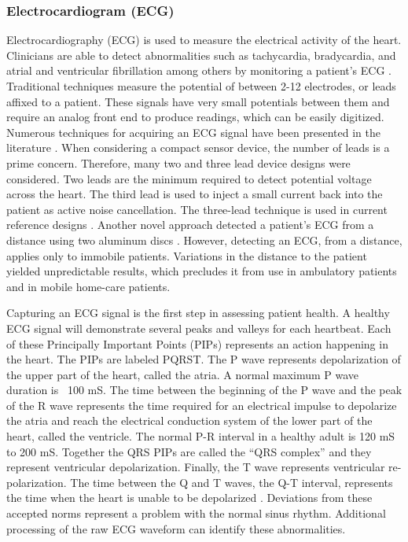 \subsubsection{Electrocardiogram (ECG)}
\label{subsubsec:Electrocardiogram}
Electrocardiography (ECG) is used to measure the electrical activity of the heart. Clinicians are able to detect abnormalities such as tachycardia, bradycardia, and atrial and ventricular fibrillation among others by monitoring a patient's ECG . Traditional techniques measure the potential of between 2-12 electrodes, or leads affixed to a patient. These signals have very small potentials between them and require an analog front end to produce readings, which can be easily digitized. Numerous techniques for acquiring an ECG signal have been presented in the literature \cite{Kim2011,Yan2011,Faggion2011,Secerbegovic2011}.  When considering a compact sensor device, the number of leads is a prime concern. Therefore, many two and three lead device designs were considered. Two leads are the minimum required to detect potential voltage across the heart. The third lead is used to inject a small current back into the patient as active noise cancellation. The three-lead technique is used in current reference designs \cite{TI2006} . Another novel approach detected a patient's ECG from a distance using two aluminum discs \cite{Belgacem2011}. However, detecting an ECG, from a distance, applies only to immobile patients. Variations in the distance to the patient yielded unpredictable results, which precludes it from use in ambulatory patients and in mobile home-care patients. 

Capturing an ECG signal is the first step in assessing patient health. A healthy ECG signal will demonstrate several peaks and valleys for each heartbeat. Each of these Principally Important Points (PIPs) represents an action happening in the heart. The PIPs are labeled PQRST. The P wave represents depolarization of the upper part of the heart, called the atria. A normal maximum P wave duration is ~100 mS. The time between the beginning of the P wave and the peak of the R wave represents the time required for an electrical impulse to depolarize the atria and reach the electrical conduction system of the lower part of the heart, called the ventricle. The normal P-R interval in a healthy adult is 120 mS to 200 mS. Together the QRS PIPs are called the ``QRS complex'' and they represent ventricular depolarization. Finally, the T wave represents ventricular re-polarization. The time between the Q and T waves, the Q-T interval, represents the time when the heart is unable to be depolarized \cite{Khorovets2000}. Deviations from these accepted norms represent a problem with the normal sinus rhythm. Additional processing of the raw ECG waveform can identify these abnormalities.

